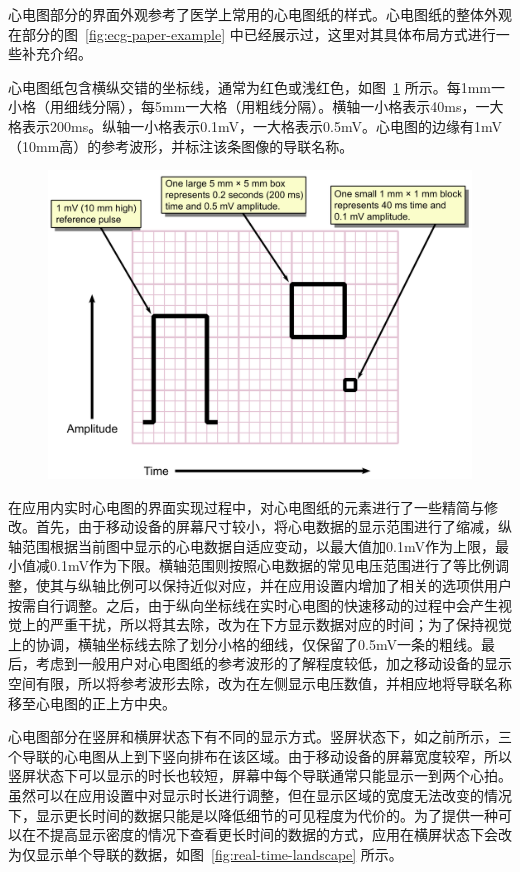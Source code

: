 心电图部分的界面外观参考了医学上常用的心电图纸的样式。心电图纸的整体外观在部分的图~\ref{fig:ecg-paper-example} 中已经展示过，这里对其具体布局方式进行一些补充介绍。

心电图纸包含横纵交错的坐标线，通常为红色或浅红色，如图~\ref{fig:ecg-paper} 所示。每1mm一小格（用细线分隔），每5mm一大格（用粗线分隔）。横轴一小格表示40ms，一大格表示200ms。纵轴一小格表示0.1mV，一大格表示0.5mV。心电图的边缘有1mV（10mm高）的参考波形，并标注该条图像的导联名称。

\begin{figure}[!ht]
    \includegraphics[width=\textwidth]{../assets/ECG_Paper_v2}
    \label{fig:ecg-paper}
\end{figure}

在应用内实时心电图的界面实现过程中，对心电图纸的元素进行了一些精简与修改。首先，由于移动设备的屏幕尺寸较小，将心电数据的显示范围进行了缩减，纵轴范围根据当前图中显示的心电数据自适应变动，以最大值加0.1mV作为上限，最小值减0.1mV作为下限。横轴范围则按照心电数据的常见电压范围进行了等比例调整，使其与纵轴比例可以保持近似对应，并在应用设置内增加了相关的选项供用户按需自行调整。之后，由于纵向坐标线在实时心电图的快速移动的过程中会产生视觉上的严重干扰，所以将其去除，改为在下方显示数据对应的时间；为了保持视觉上的协调，横轴坐标线去除了划分小格的细线，仅保留了0.5mV一条的粗线。最后，考虑到一般用户对心电图纸的参考波形的了解程度较低，加之移动设备的显示空间有限，所以将参考波形去除，改为在左侧显示电压数值，并相应地将导联名称移至心电图的正上方中央。

心电图部分在竖屏和横屏状态下有不同的显示方式。竖屏状态下，如之前所示，三个导联的心电图从上到下竖向排布在该区域。由于移动设备的屏幕宽度较窄，所以竖屏状态下可以显示的时长也较短，屏幕中每个导联通常只能显示一到两个心拍。虽然可以在应用设置中对显示时长进行调整，但在显示区域的宽度无法改变的情况下，显示更长时间的数据只能是以降低细节的可见程度为代价的。为了提供一种可以在不提高显示密度的情况下查看更长时间的数据的方式，应用在横屏状态下会改为仅显示单个导联的数据，如图~\ref{fig:real-time-landscape} 所示。

